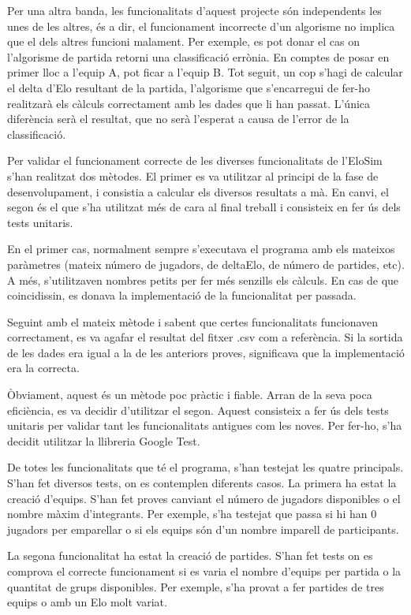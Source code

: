 \documentclass[a4paper]{article}
\begin{document}
Per una altra banda, les funcionalitats d'aquest projecte són independents les unes de les altres, és a dir, el funcionament incorrecte d'un algorisme no implica que el dels altres funcioni malament. Per exemple, es pot donar el cas on l'algorisme de partida retorni una classificació errònia. En comptes de posar en primer lloc a l'equip A, pot ficar a l'equip B. Tot seguit, un cop s'hagi de calcular el delta d'Elo resultant de la partida, l'algorisme que s'encarregui de fer-ho realitzarà els càlculs correctament amb les dades que li han passat. L'única diferència serà el resultat, que no serà l'esperat a causa de l'error de la classificació.

Per validar el funcionament correcte de les diverses funcionalitats de l'EloSim s'han realitzat dos mètodes. El primer es va utilitzar al principi de la fase de desenvolupament, i consistia a calcular els diversos resultats a mà. En canvi, el segon és el que s'ha utilitzat més de cara al final treball i consisteix en fer ús dels tests unitaris.

En el primer cas, normalment sempre s'executava el programa amb els mateixos paràmetres (mateix número de jugadors, de deltaElo, de número de partides, etc). A més, s'utilitzaven nombres petits per fer més senzills els càlculs. En cas de que coincidissin, es donava la implementació de la funcionalitat per passada.

Seguint amb el mateix mètode i sabent que certes funcionalitats funcionaven correctament, es va agafar el resultat del fitxer .csv com a referència. Si la sortida de les dades era igual a la de les anteriors proves, significava que la implementació era la correcta.

Òbviament, aquest és un mètode poc pràctic i fiable. Arran de la seva poca eficiència, es va decidir d'utilitzar el segon. Aquest consisteix a fer ús dels tests unitaris per validar tant les funcionalitats antigues com les noves. Per fer-ho, s'ha decidit utilitzar la llibreria Google Test.

De totes les funcionalitats que té el programa, s'han testejat les quatre principals. S'han fet diversos tests, on es contemplen diferents casos. La primera ha estat la creació d'equips. S'han fet proves canviant el número de jugadors disponibles o el nombre màxim d'integrants. Per exemple, s'ha testejat que passa si hi han 0 jugadors per emparellar o si els equips són d'un nombre imparell de participants.

La segona funcionalitat ha estat la creació de partides. S'han fet tests on es comprova el correcte funcionament si es varia el nombre d'equips per partida o la quantitat de grups disponibles. Per exemple, s'ha provat a fer partides de tres equips o amb un Elo molt variat.
\end{document}
